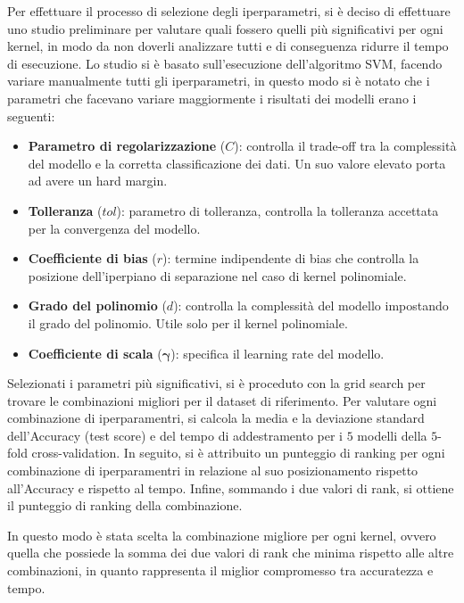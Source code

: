 Per effettuare il processo di selezione degli iperparametri, si è deciso di
effettuare uno studio preliminare per valutare quali fossero quelli più
significativi per ogni kernel, in modo da non doverli analizzare tutti e di
conseguenza ridurre il tempo di esecuzione. Lo studio si è basato sull'esecuzione 
dell'algoritmo SVM, facendo variare manualmente tutti gli iperparametri, in questo 
modo si è notato che i parametri che facevano variare maggiormente i risultati 
dei modelli erano i seguenti:
\begin{itemize}
    \item \textbf{Parametro di regolarizzazione} ($C$): controlla il trade-off tra
          la complessità del modello e la corretta classificazione dei dati.
          Un suo valore elevato porta ad avere un hard margin.
    \item \textbf{Tolleranza} ($tol$): parametro di tolleranza, controlla la
          tolleranza accettata per la convergenza del modello.
    \item \textbf{Coefficiente di bias} ($r$): termine indipendente di bias che
          controlla la posizione dell'iperpiano di separazione nel caso di
          kernel polinomiale.
    \item \textbf{Grado del polinomio} ($d$): controlla la complessità del modello
          impostando il grado del polinomio. Utile solo per il kernel polinomiale.
    \item \textbf{Coefficiente di scala} ($\boldsymbol{\gamma}$): specifica il learning
          rate del modello.
\end{itemize}

Selezionati i parametri più significativi, si è proceduto con la grid search 
per trovare le combinazioni migliori per il dataset di riferimento. Per valutare
ogni combinazione di iperparamentri, si calcola la media e la deviazione standard
dell'Accuracy (test score) e del tempo di addestramento per i $5$ modelli della $5$-fold 
cross-validation.
In seguito, si è attribuito un punteggio di ranking per ogni combinazione
di iperparamentri in relazione al suo posizionamento rispetto all'Accuracy e rispetto
al tempo. Infine, sommando i due valori di rank, si ottiene il punteggio di ranking
della combinazione. 

In questo modo è stata scelta la combinazione migliore per ogni kernel, ovvero quella che possiede la somma
dei due valori di rank che minima rispetto alle altre combinazioni, in quanto rappresenta 
il miglior compromesso tra accuratezza e tempo.

